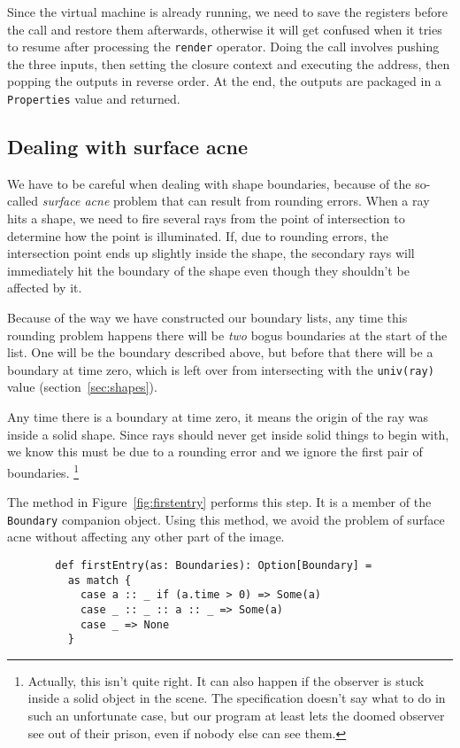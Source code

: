 Since the virtual machine is already running,
we need to save the registers before the call and restore them afterwards,
otherwise it will get confused when it tries to resume
after processing the \verb!render! operator.
Doing the call involves pushing the three inputs,
then setting the closure context and executing the address,
then popping the outputs in reverse order.
At the end, the outputs are
packaged in a \verb!Properties! value and returned.


\subsection{Dealing with surface acne\label{sec:acne}}

We have to be careful when dealing with shape boundaries,
because of the so-called \emph{surface acne} problem
that can result from rounding errors.
When a ray hits a shape,
we need to fire several rays from the point of intersection
to determine how the point is illuminated.
If, due to rounding errors,
the intersection point ends up slightly inside the shape,
the secondary rays will immediately hit the boundary of the shape
even though they shouldn't be affected by it.

Because of the way we have constructed our boundary lists,
any time this rounding problem happens
there will be \emph{two} bogus boundaries at the start of the list.
One will be the boundary described above,
but before that there will be a boundary at time zero,
which is left over from intersecting with the \verb!univ(ray)! value
(section~\ref{sec:shapes}).

Any time there is a boundary at time zero,
it means the origin of the ray was inside a solid shape.
Since rays should never get inside solid things to begin with,
we know this must be due to a rounding error
and we ignore the first pair of boundaries.%
\footnote{Actually, this isn't quite right.
It can also happen if the observer
is stuck inside a solid object in the scene.
The specification doesn't say what to do in such an unfortunate case,
but our program at least lets the doomed observer
see out of their prison,
even if nobody else can see them.}

The method in Figure~\ref{fig:firstentry} performs this step.
It is a member of the \verb!Boundary! companion object.
Using this method, we avoid the problem of surface acne
without affecting any other part of the image.

\begin{figure}
\begin{verbatim}
  def firstEntry(as: Boundaries): Option[Boundary] =
    as match {
      case a :: _ if (a.time > 0) => Some(a)
      case _ :: _ :: a :: _ => Some(a)
      case _ => None
    }
\end{verbatim}
\getcaption
\end{figure}


